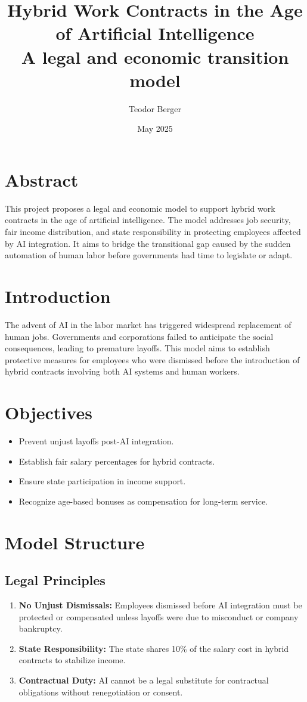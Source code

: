 \documentclass[12pt]{article}
\title{\textbf{Hybrid Work Contracts in the Age of Artificial Intelligence}\\[0.5em]
\large A legal and economic transition model}
\author{Teodor Berger}
\date{May 2025}
\begin{document}
\sloppy
\maketitle

\section*{Abstract}
This project proposes a legal and economic model to support hybrid work contracts in the age of artificial intelligence. The model addresses job security, fair income distribution, and state responsibility in protecting employees affected by AI integration. It aims to bridge the transitional gap caused by the sudden automation of human labor before governments had time to legislate or adapt.

\section{Introduction}
The advent of AI in the labor market has triggered widespread replacement of human jobs. Governments and corporations failed to anticipate the social consequences, leading to premature layoffs. This model aims to establish protective measures for employees who were dismissed before the introduction of hybrid contracts involving both AI systems and human workers.

\section{Objectives}
\begin{itemize}
  \item Prevent unjust layoffs post-AI integration.
  \item Establish fair salary percentages for hybrid contracts.
  \item Ensure state participation in income support.
  \item Recognize age-based bonuses as compensation for long-term service.
\end{itemize}

\section{Model Structure}

\subsection{Legal Principles}
\begin{enumerate}
  \item \textbf{No Unjust Dismissals:} Employees dismissed before AI integration must be protected or compensated unless layoffs were due to misconduct or company bankruptcy.
  \item \textbf{State Responsibility:} The state shares 10\% of the salary cost in hybrid contracts to stabilize income.
  \item \textbf{Contractual Duty:} AI cannot be a legal substitute for contractual obligations without renegotiation or consent.
\end{enumerate}
\end{document}
